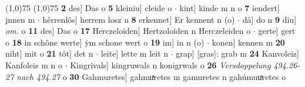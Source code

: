 \documentclass[8pt,a4paper,notitlepage]{article}
\begin{document}
\begin{table}[ht]
\begin{minipage}[t]{0.5\linewidth}
\line(1,0){75} \newline
\newline
\line(1,0){75} \newline
\textbf{2} des] Das o \textbf{5} kleiniu] cleide o  $\cdot$ kint] kinde m n o \textbf{7} iendert] jnnen m  $\cdot$ hêrrenlôs] herrem losz n \textbf{8} erkennet] Er kennent n (o)  $\cdot$ dâ] do n \textbf{9} diu] \textit{om.} o \textbf{11} des] Das o \textbf{17} Herczeloiden] Hertzoloiden n Herczeleiden o  $\cdot$ gerte] gert o \textbf{18} in schône werte] ẏm schone wert o \textbf{19} im] in n (o)  $\cdot$ konen] kennen m \textbf{20} niht] mit o \textbf{21} tôt] det n  $\cdot$ leite] lette m leit n  $\cdot$ grap] [gras]: grab m \textbf{24} Kanvoleiz] Kanfoleis m n o  $\cdot$ Kingrivals] kingruwals n konigrwals o \textbf{26} \textit{Versdoppelung 494.26-27 nach 494.27} o  \textbf{30} Gahmuretes] gahmuͯretes m gamuretes n gahúmuuͯretes o \newline
\end{minipage}
\end{table}
\newpage
\end{document}
